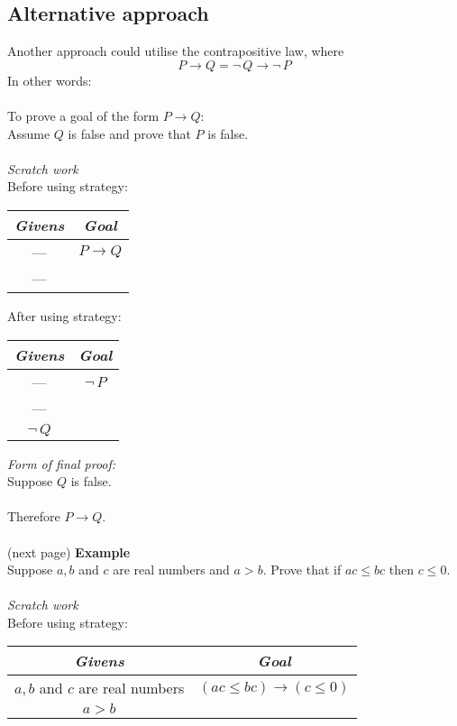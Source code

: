 \documentclass{report}
\begin{document}
\subsection{Alternative approach}
Another approach could utilise the contrapositive law, where 
\begin{equation*}
P\to Q=\neg\,Q\to\neg\,P
\end{equation*}
In other words:\\
\vspace{1mm}\\
\indent To prove a goal of the form $P\to Q$:\\
\indent Assume $Q$ is false and prove that $P$ is false.\\
\vspace{1mm}\\
\textit{Scratch work}\\
Before using strategy:
\begin{center}
\begin{tabular}{c|c}
\textit{Givens}&\textit{Goal}\\
\hline
---&$P\to Q$\\
---&
\end{tabular}
\end{center}
After using strategy:
\begin{center}
\begin{tabular}{c|c}
\textit{Givens}&\textit{Goal}\\
\hline
---&$\neg\,P$\\
---&\\
$\neg\,Q$&
\end{tabular}
\end{center}
\textit{Form of final proof:}\\
\indent Suppose $Q$ is false.\\
\indent{}\\
\indent Therefore $P\to Q$.\\
\vspace{1mm}\\
(next page)\newpage
\noindent\textbf{Example}\\
Suppose $a,b$ and $c$ are real numbers and $a>b$. Prove that if $ac\leq bc$ then $c\leq0$.\\
\vspace{1mm}\\
\textit{Scratch work}\\
Before using strategy:
\begin{center}
\begin{tabular}{c|c}
\textit{Givens}&\textit{Goal}\\
\hline
$a,b$ and $c$ are real numbers&$(ac\leq bc)\to(c\leq0)$\\
$a>b$&
\end{tabular}
\end{center}
\end{document}

